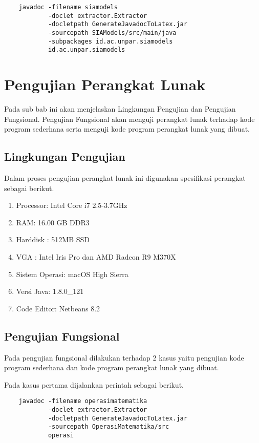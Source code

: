 \begin{verbatim}
	javadoc -filename siamodels
	        -doclet extractor.Extractor
	        -docletpath GenerateJavadocToLatex.jar
	        -sourcepath SIAModels/src/main/java
	        -subpackages id.ac.unpar.siamodels
	        id.ac.unpar.siamodels
\end{verbatim}

\section{Pengujian Perangkat Lunak}
\label{sec: pengujian perangkat lunak}
Pada sub bab ini akan menjelaskan Lingkungan Pengujian dan Pengujian Fungsional. Pengujian Fungsional akan menguji perangkat lunak terhadap kode program sederhana serta menguji kode program perangkat lunak yang dibuat.
\subsection{Lingkungan Pengujian}
\label{sec:lingkungan perangkat lunak}
Dalam proses pengujian perangkat lunak ini digunakan spesifikasi perangkat sebagai berikut.

\begin{enumerate}
	\item Processor: Intel Core i7 2.5-3.7GHz 
	\item RAM: 16.00 GB DDR3	
	\item Harddisk : 512MB SSD
	\item VGA : Intel Iris Pro dan AMD Radeon R9 M370X
	\item Sistem Operasi: macOS High Sierra
	\item Versi Java: 1.8.0\_121
	\item Code Editor: Netbeans 8.2
\end{enumerate}

\subsection{Pengujian Fungsional}
\label{sec:pengujian fungsional}
Pada pengujian fungsional dilakukan terhadap 2 kasus yaitu pengujian kode program sederhana dan kode program perangkat lunak yang dibuat.

Pada kasus pertama dijalankan perintah sebagai berikut.

\begin{verbatim}
	javadoc -filename operasimatematika
	        -doclet extractor.Extractor
	        -docletpath GenerateJavadocToLatex.jar
	        -sourcepath OperasiMatematika/src
	        operasi
\end{verbatim}

